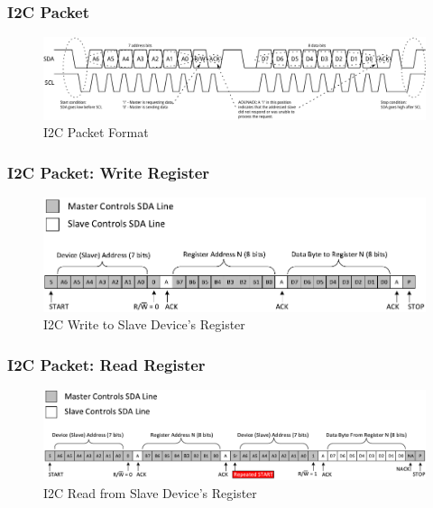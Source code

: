 \begin{frame}
  \frametitle{I2C Packet}
  \begin{figure}
    \hspace*{-8mm}
    \includegraphics[scale=0.58]{images/i2c-packet.png}\hspace*{-8mm}
    \caption{I2C Packet Format}
  \end{figure}
\end{frame}

\begin{frame}
  \frametitle{I2C Packet: Write Register}
  \begin{figure}
    \hspace*{-8mm}
    \includegraphics[scale=0.9]{images/i2c-write-reg.pdf}\hspace*{-8mm}
    \caption{I2C Write to Slave Device's Register}
  \end{figure}
\end{frame}

\begin{frame}
  \frametitle{I2C Packet: Read Register}
  \begin{figure}
    \hspace*{-10mm}
    \includegraphics[scale=0.9]{images/i2c-read-reg.pdf}\hspace*{-10mm}
    \caption{I2C Read from Slave Device's Register}
  \end{figure}
\end{frame}

